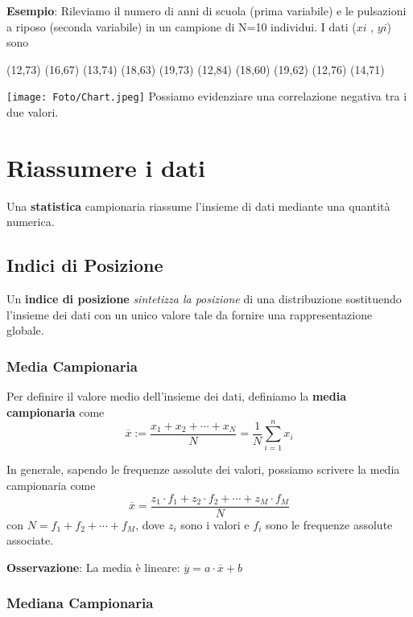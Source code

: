 \begin{tcolorbox}
    \textbf{Esempio}: Rileviamo il numero di anni di scuola (prima variabile) e le pulsazioni a riposo (seconda variabile) in un campione di N=10 individui. I dati ($xi$ , $yi$) sono
    \begin{center}
        (12,73) (16,67) (13,74) (18,63) (19,73) (12,84) (18,60) (19,62) (12,76) (14,71)
    \end{center}
    \centering\texttt{[image: Foto/Chart.jpeg]} \newline
    Possiamo evidenziare una correlazione negativa tra i due valori.

\end{tcolorbox}

\newpage
\section{Riassumere i dati}

Una \textbf{statistica} campionaria riassume l'insieme di dati mediante una quantità numerica.

\subsection{Indici di Posizione}

Un \textbf{indice di posizione} \textit{sintetizza la posizione} di una distribuzione sostituendo l'insieme dei dati con un unico valore tale da fornire una rappresentazione globale.

\subsubsection{Media Campionaria}

Per definire il valore medio dell'insieme dei dati, definiamo la \textbf{media campionaria} come $$ \overline{x} := \dfrac{x_1 + x_2 + \cdots + x_N}{N} = \dfrac{1}{N} \sum_{i=1}^n x_i $$

\noindent In generale, sapendo le frequenze assolute dei valori, possiamo scrivere la media campionaria come $$ \overline{x} = \dfrac{z_1 \cdot f_1 + z_2 \cdot f_2 + \cdots + z_M \cdot f_M}{N}$$ con $N= f_1 + f_2 + \cdots + f_M$, dove $z_i$ sono i valori e $f_i$ sono le frequenze assolute associate. \newline

\noindent \textbf{Osservazione}: La media è lineare: $\overline{y} = a \cdot \overline{x} + b$ 

\subsubsection{Mediana Campionaria}

